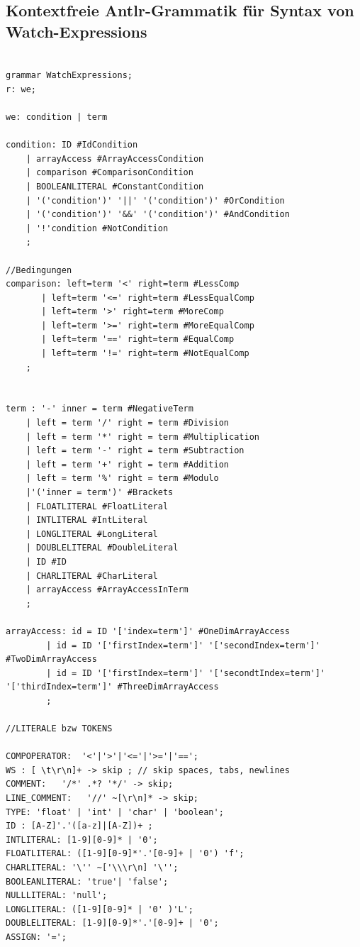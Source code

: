 \documentclass[parskip=full]{scrartcl}
\begin{document}
\subsection{Kontextfreie Antlr-Grammatik für Syntax von Watch-Expressions}
\begin{verbatim}

grammar WatchExpressions;
r: we;

we: condition | term

condition: ID #IdCondition
	| arrayAccess #ArrayAccessCondition
	| comparison #ComparisonCondition
	| BOOLEANLITERAL #ConstantCondition
	| '('condition')' '||' '('condition')' #OrCondition
	| '('condition')' '&&' '('condition')' #AndCondition
	| '!'condition #NotCondition
	;
	
//Bedingungen
comparison: left=term '<' right=term #LessComp
	   | left=term '<=' right=term #LessEqualComp
	   | left=term '>' right=term #MoreComp
	   | left=term '>=' right=term #MoreEqualComp
	   | left=term '==' right=term #EqualComp
	   | left=term '!=' right=term #NotEqualComp
	;


term : '-' inner = term #NegativeTerm
    | left = term '/' right = term #Division
	| left = term '*' right = term #Multiplication
	| left = term '-' right = term #Subtraction
	| left = term '+' right = term #Addition
	| left = term '%' right = term #Modulo
	|'('inner = term')' #Brackets
	| FLOATLITERAL #FloatLiteral
	| INTLITERAL #IntLiteral
	| LONGLITERAL #LongLiteral
	| DOUBLELITERAL #DoubleLiteral
	| ID #ID
	| CHARLITERAL #CharLiteral
	| arrayAccess #ArrayAccessInTerm
	;

arrayAccess: id = ID '['index=term']' #OneDimArrayAccess
		| id = ID '['firstIndex=term']' '['secondIndex=term']' #TwoDimArrayAccess
		| id = ID '['firstIndex=term']' '['secondtIndex=term']' '['thirdIndex=term']' #ThreeDimArrayAccess
		;

//LITERALE bzw TOKENS

COMPOPERATOR:  '<'|'>'|'<='|'>='|'==';
WS : [ \t\r\n]+ -> skip ; // skip spaces, tabs, newlines
COMMENT:   '/*' .*? '*/' -> skip;
LINE_COMMENT:   '//' ~[\r\n]* -> skip;
TYPE: 'float' | 'int' | 'char' | 'boolean';
ID : [A-Z]'.'([a-z]|[A-Z])+ ;
INTLITERAL: [1-9][0-9]* | '0';
FLOATLITERAL: ([1-9][0-9]*'.'[0-9]+ | '0') 'f';
CHARLITERAL: '\'' ~['\\\r\n] '\'';
BOOLEANLITERAL:	'true'|	'false';
NULLLITERAL: 'null';
LONGLITERAL: ([1-9][0-9]* | '0' )'L';
DOUBLELITERAL: [1-9][0-9]*'.'[0-9]+ | '0';
ASSIGN: '=';

\end{verbatim}
\end{document}
